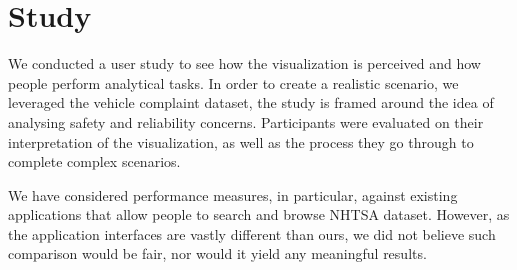 % 


\section{Study}
We conducted a user study to see how the visualization is perceived and how
people perform analytical tasks. In order to create a realistic scenario, we
leveraged the vehicle complaint dataset, the study is framed around the idea of
analysing safety and reliability concerns. Participants were evaluated on their
interpretation of the visualization, as well as the process they go through to 
complete complex scenarios. 

We have considered performance measures, in particular, against existing applications
that allow people to search and browse NHTSA dataset. However, as the application
interfaces are vastly different than ours, we did not believe such comparison would
be fair, nor would it yield any meaningful results.



